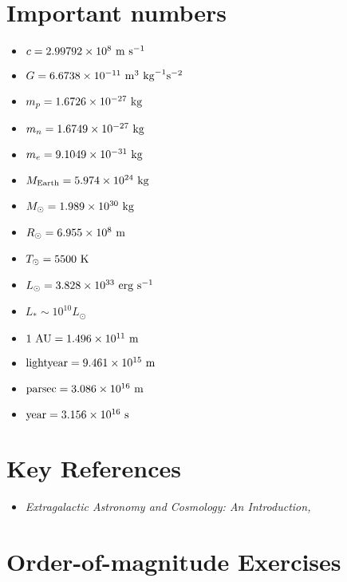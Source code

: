 \section{Important numbers}

\begin{itemize}
\item $c = 2.99792 \times 10^8  {\rm ~m} {\rm ~s}^{-1} $
\item $G = 6.6738 \times 10^{-11} {\rm ~m}^3 {\rm ~kg}^{-1} {\rm s}^{-2} $
\item $m_p =  1.6726 \times 10^{-27} {\rm ~kg} $
\item $m_n =  1.6749 \times 10^{-27} {\rm ~kg} $
\item $m_e =  9.1049 \times 10^{-31} {\rm ~kg} $
\item $M_{\rm Earth} = 5.974 \times 10^{24} {\rm ~kg} $
\item $M_{\odot} = 1.989 \times 10^{30} {\rm ~kg} $
\item $R_{\odot} = 6.955 \times 10^{8} {\rm ~m} $
\item $T_{\odot} = 5500 {\rm ~K} $
\item $L_{\odot} = 3.828 \times 10^{33} {\rm ~erg} {\rm ~s}^{-1}$
\item $L_{\ast} \sim 10^{10} L_{\odot} $
\item ${\rm 1~AU} = 1.496 \times 10^{11} {\rm ~m} $
\item ${\rm lightyear} = 9.461 \times 10^{15} {\rm ~m} $
\item ${\rm parsec} = 3.086 \times 10^{16} {\rm ~m} $
\item ${\rm year} = 3.156 \times 10^{16} {\rm ~s} $
\end{itemize}

\section{Key References}

\begin{itemize}
  \item {\it Extragalactic Astronomy and Cosmology: An Introduction,
    \citet{schneider15a}}
\end{itemize}

\section{Order-of-magnitude Exercises}

